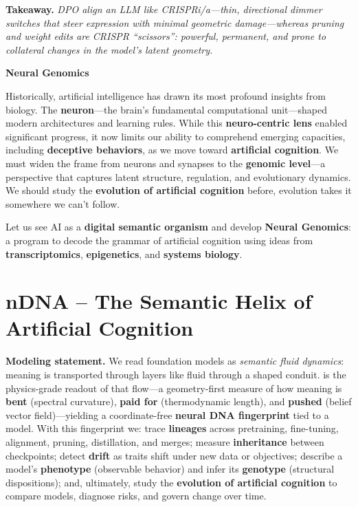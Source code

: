 \vspace{0.5em}
\noindent
\textbf{Takeaway.}
\emph{DPO align an LLM like CRISPRi/a—thin, directional dimmer switches that steer expression with minimal geometric damage—whereas pruning and weight edits are CRISPR ``scissors'': powerful, permanent, and prone to collateral changes in the model’s latent geometry.}


\clearpage
\newpage

\begin{center}
{\LARGE \textbf{Neural Genomics}}\\[0.4em]
\end{center}
\noindent
Historically, artificial intelligence has drawn its most profound insights from biology. The \textbf{neuron}---the brain's fundamental computational unit---shaped modern architectures and learning rules. While this \textbf{neuro-centric lens} enabled significant progress, it now limits our ability to comprehend emerging capacities, including \textbf{deceptive behaviors}, as we move toward \textbf{artificial cognition}. We must widen the frame from neurons and synapses to the \textbf{genomic level}---a perspective that captures latent structure, regulation, and evolutionary dynamics. We should study the \textbf{evolution of artificial cognition} before, evolution takes it somewhere we can’t follow.

\medskip
\noindent
Let us see AI as a \textbf{digital semantic organism} and develop \textbf{Neural Genomics}: a program to decode the grammar of artificial cognition using ideas from \textbf{transcriptomics}, \textbf{epigenetics}, and \textbf{systems biology}.

\section*{nDNA -- The Semantic Helix of Artificial Cognition}
\textbf{Modeling statement.} We read foundation models as \emph{semantic fluid dynamics}: meaning is transported through layers like fluid through a shaped conduit. \textbf{\ndna{}} is the physics-grade readout of that flow---a geometry-first measure of how meaning is \textbf{bent} (spectral curvature), \textbf{paid for} (thermodynamic length), and \textbf{pushed} (belief vector field)---yielding a coordinate-free \textbf{neural DNA fingerprint} tied to a model. With this fingerprint we: trace \textbf{lineages} across pretraining, fine-tuning, alignment, pruning, distillation, and merges; measure \textbf{inheritance} between checkpoints; detect \textbf{drift} as traits shift under new data or objectives; describe a model's \textbf{phenotype} (observable behavior) and infer its \textbf{genotype} (structural dispositions); and, ultimately, study the \textbf{evolution of artificial cognition} to compare models, diagnose risks, and govern change over time.

